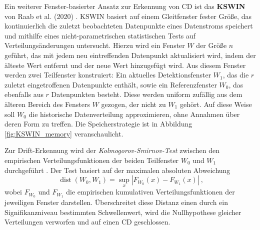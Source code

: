 Ein weiterer Fenster-basierter Ansatz zur Erkennung von \ac{CD} ist das \textbf{\ac{KSWIN}} von Raab et al. (2020) \cite{raab.2020}. \ac{KSWIN} basiert auf einem Gleitfenster fester Größe, das kontinuierlich die zuletzt beobachteten Datenpunkte eines Datenstroms speichert und mithilfe eines nicht-parametrischen statistischen Tests auf Verteilungsänderungen untersucht. Hierzu wird ein Fenster $W$ der Größe $n$ geführt, das mit jedem neu eintreffenden Datenpunkt aktualisiert wird, indem der älteste Wert entfernt und der neue Wert hinzugefügt wird. Aus diesem Fenster werden zwei Teilfenster konstruiert: Ein aktuelles Detektionsfenster $W_1$, das die $r$ zuletzt eingetroffenen Datenpunkte enthält, sowie ein Referenzfenster $W_0$, das ebenfalls aus $r$ Datenpunkten besteht. Diese werden uniform zufällig aus dem älteren Bereich des Fensters $W$ gezogen, der nicht zu $W_1$ gehört. Auf diese Weise soll $W_0$ die historische Datenverteilung approximieren, ohne Annahmen über deren Form zu treffen. Die Speicherstrategie ist in Abbildung \ref{fig:KSWIN_memory} veranschaulicht. \par
Zur Drift-Erkennung wird der \emph{Kolmogorov-Smirnov-Test} zwischen den empirischen Verteilungsfunktionen der beiden Teilfenster $W_0$ und $W_1$ durchgeführt \cite{lopes.2011}. Der Test basiert auf der maximalen absoluten Abweichung
%
\begin{equation}
    \operatorname{dist}(W_0,W_1) = \sup_x \left| F_{W_0}(x) - F_{W_1}(x) \right| \ \text{,}    
\end{equation}
%
wobei $F_{W_0}$ und $F_{W_1}$ die empirischen kumulativen Verteilungsfunktionen der jeweiligen Fenster darstellen. Überschreitet diese Distanz einen durch ein Signifikanzniveau bestimmten Schwellenwert, wird die Nullhypothese gleicher Verteilungen verworfen und auf einen \ac{CD} geschlossen.
%
